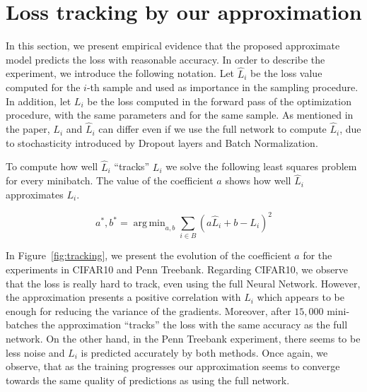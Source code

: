 \documentclass{article}
\DeclareMathOperator*{\argmin}{arg\,min}
\begin{document}
\vfill\eject

\section{Loss tracking by our approximation}

In this section, we present empirical evidence that the proposed approximate
model predicts the loss with reasonable accuracy. In order to describe the
experiment, we introduce the following notation. Let $\hat{L}_i$ be the loss
value computed for the $i$-th sample and used as importance in the sampling
procedure. In addition, let $L_i$ be the loss computed in the forward pass of
the optimization procedure, with the same parameters and for the same sample.
As mentioned in the paper, $L_i$ and $\hat{L}_i$ can differ even if we use the
full network to compute $\hat{L}_i$, due to stochasticity introduced by Dropout
layers and Batch Normalization.

To compute how well $\hat{L}_i$ ``tracks'' $L_i$ we solve the following
least squares problem for every minibatch. The value of the coefficient $a$
shows how well $\hat{L}_i$ approximates $L_i$.

\begin{equation} \label{eq:prediction_quality}
a^*, b^* = \argmin_{a, b} \sum_{i \in B} \left(a \hat{L}_i + b - L_i\right)^2
\end{equation}

In Figure~\ref{fig:tracking}, we present the evolution of the coefficient $a$
for the experiments in CIFAR10 and Penn Treebank. Regarding CIFAR10, we observe
that the loss is really hard to track, even using the full Neural Network.
However, the approximation presents a positive correlation with $L_i$ which
appears to be enough for reducing the variance of the gradients. Moreover,
after $15,000$ mini-batches the approximation ``tracks'' the loss with the same
accuracy as the full network. On the other hand, in the Penn Treebank experiment,
there seems to be less noise and $L_i$ is predicted accurately by both methods.
Once again, we observe, that as the training progresses our approximation seems
to converge towards the same quality of predictions as using the full network.
\end{document}
